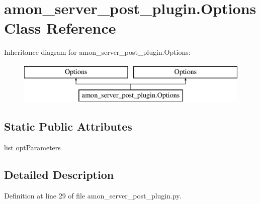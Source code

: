 \hypertarget{classamon__server__post__plugin_1_1_options}{\section{amon\-\_\-server\-\_\-post\-\_\-plugin.\-Options Class Reference}
\label{classamon__server__post__plugin_1_1_options}
}
Inheritance diagram for amon\-\_\-server\-\_\-post\-\_\-plugin.\-Options\-:\begin{figure}[H]
\begin{center}
\leavevmode
\includegraphics[height=2.000000cm]{d1/d47/classamon__server__post__plugin_1_1_options}
\end{center}
\end{figure}
\subsection*{Static Public Attributes}
\begin{DoxyCompactItemize}
\item 
list \hyperlink{classamon__server__post__plugin_1_1_options_af6fcb688391f41e537792928693a9623}{opt\-Parameters}
\end{DoxyCompactItemize}


\subsection{Detailed Description}


Definition at line 29 of file amon\-\_\-server\-\_\-post\-\_\-plugin.\-py.



